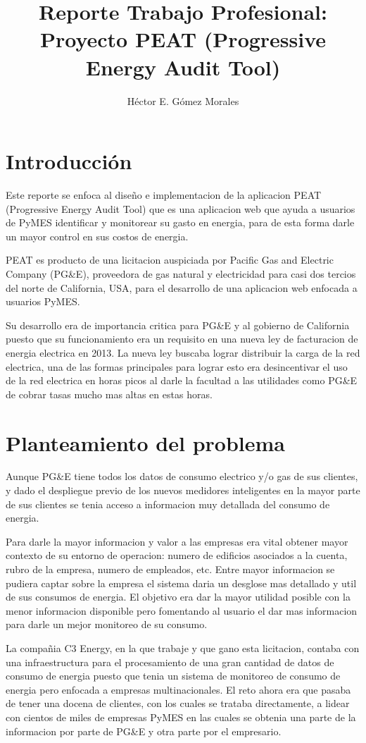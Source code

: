 \documentclass{article}
\author{Héctor E. Gómez Morales}
\title{Reporte Trabajo Profesional: Proyecto PEAT (Progressive Energy
  Audit Tool)}
\begin{document}
\maketitle
\tableofcontents
\section{Introducción}
Este reporte se enfoca al diseño e implementacion de la aplicacion
PEAT (Progressive Energy Audit Tool) que es una aplicacion web que
ayuda a usuarios de PyMES identificar y monitorear su gasto en
energia, para de esta forma darle un mayor control en sus costos de
energia.

PEAT es producto de una licitacion auspiciada por Pacific Gas and
Electric Company (PG\&E), proveedora de gas natural y electricidad
para casi dos tercios del norte de California, USA, para
el desarrollo de una aplicacion web enfocada a usuarios PyMES.

Su desarrollo era de importancia critica para PG\&E y al gobierno de
California puesto que su funcionamiento era un requisito en una nueva
ley de facturacion de energia electrica en 2013. La nueva ley buscaba
lograr distribuir la carga de la red electrica, una de las formas
principales para lograr esto era desincentivar el uso de la red
electrica en horas picos al darle la facultad a las utilidades como PG\&E
de cobrar tasas mucho mas altas en estas horas.
\section{Planteamiento del problema}
Aunque PG\&E tiene todos los datos de consumo electrico y/o gas de
sus clientes, y dado el despliegue previo de los nuevos medidores
inteligentes en la mayor parte de sus clientes se tenia acceso a
informacion muy detallada del consumo de energia.

Para darle la mayor informacion y valor a las empresas era
vital obtener mayor contexto de su entorno de operacion: numero
de edificios asociados a la cuenta, rubro de la empresa, numero de
empleados, etc. Entre mayor informacion se pudiera captar sobre la
empresa el sistema daria un desglose mas detallado y util de sus
consumos de energia. El objetivo era dar la mayor utilidad posible con
la menor informacion disponible pero fomentando al usuario el dar
mas informacion para darle un mejor monitoreo de su consumo.

La compañia C3 Energy, en la que trabaje y que gano esta licitacion,
contaba con una infraestructura para el procesamiento de una gran
cantidad de datos de consumo de energia puesto que tenia un sistema
de monitoreo de consumo de energia pero enfocada a empresas
multinacionales. El reto ahora era que pasaba de tener una docena
de clientes, con los cuales se trataba directamente, a lidear con
cientos de miles de empresas PyMES en las cuales se obtenia una
parte de la informacion por parte de PG\&E y otra parte por el
empresario.
\end{document}

